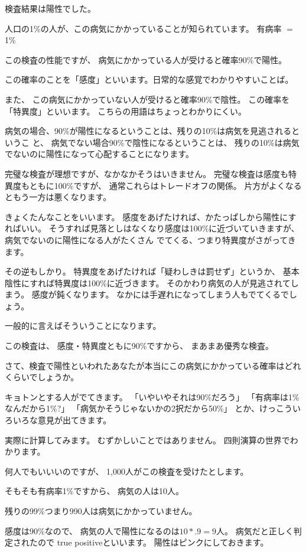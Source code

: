 \documentclass[uplatex,jis2004,dvipdfmx,12pt]{jsarticle}
\begin{document}
検査結果は陽性でした。

人口の1\%の人が、この病気にかかっていることが知られています。
有病率 $=$ 1\%

この検査の性能ですが、
病気にかかっている人が受けると確率90\%で陽性。

この確率のことを「感度」といいます。日常的な感覚でわかりやすいことば。

また、
この病気にかかっていない人が受けると確率90\%で陰性。
この確率を「特異度」といいます。
こちらの用語はちょっとわかりにくい。

病気の場合、90\%が陽性になるということは、残りの10\%は病気を見逃されるというこ
と、
病気でない場合90\%で陰性になるということは、
残りの10\%は病気でないのに陽性になって心配することになります。

完璧な検査が理想ですが、なかなかそうはいきません。
完璧な検査は感度も特異度もともに100\%ですが、
通常これらはトレードオフの関係。
片方がよくなるともう一方は悪くなります。

きょくたんなことをいいます。
感度をあげたければ、かたっぱしから陽性にすればいい。
そうすれば見落としはなくなり感度は100\%に近づいていきますが、
病気でないのに陽性になる人がたくさん
でてくる、つまり特異度がさがってきます。

その逆もしかり。
特異度をあげたければ「疑わしきは罰せず」というか、
基本陰性にすれば特異度は100\%に近づきます。
そのかわり病気の人が見逃されてしまう。
感度が鈍くなります。
なかには手遅れになってしまう人もでてくるでしょう。

一般的に言えばそういうことになります。

この検査は、
感度・特異度ともに90\%ですから、
まあまあ優秀な検査。


さて、検査で陽性といわれたあなたが本当にこの病気にかかっている確率はどれくらいでしょうか。

キョトンとする人がでてきます。
「いやいやそれは90\%だろう」
「有病率は1\%なんだから1\%?」
「病気かそうじゃないかの2択だから50\%」
とか、けっこういろいろな意見が出てきます。

実際に計算してみます。
むずかしいことではありません。
四則演算の世界でわかります。

何人でもいいいのですが、
1,000人がこの検査を受けたとします。


そもそも有病率1\%ですから、
病気の人は10人。

残りの99\%つまり990人は病気にかかっていません。

感度は90\%なので、
病気の人で陽性になるのは$10*.9=9$人。
病気だと正しく判定されたので
true positiveといいます。
陽性はピンクにしておきます。
\end{document}
